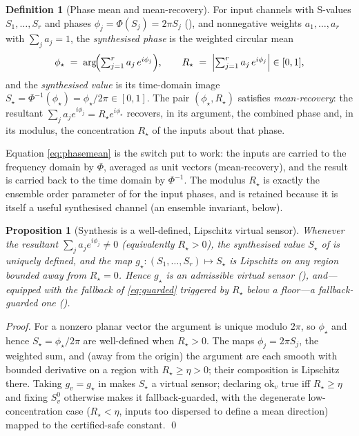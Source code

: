 \documentclass[11pt,a4paper,twocolumn]{article}
\theoremstyle{thmstyle}
\newtheorem{proposition}[theorem]{Proposition}
\theoremstyle{definition}
\newtheorem{definition}[theorem]{Definition}
\theoremstyle{remark}
\newcommand{\Rstar}{R_{\star}}
\begin{document}
\begin{definition}[Phase mean and mean-recovery]
\label{def:meanrec}
For input channels with S-values $S_1,\dots,S_r$ and phases
$\phi_j=\Phi(S_j)=2\pi S_j$ (), and nonnegative weights
$a_1,\dots,a_r$ with $\sum_j a_j=1$, the \emph{synthesised phase} is the
weighted circular mean
\begin{equation}
\label{eq:phasemean}
\phi_\star \;=\; \arg\!\Bigl(\textstyle\sum_{j=1}^{r} a_j\,e^{i\phi_j}\Bigr),
\qquad
\Rstar \;=\; \Bigl|\textstyle\sum_{j=1}^{r} a_j\,e^{i\phi_j}\Bigr|\in[0,1],
\end{equation}
and the \emph{synthesised value} is its time-domain image
$S_\star=\Phi^{-1}(\phi_\star)=\phi_\star/2\pi\in[0,1]$. The pair
$(\phi_\star,\Rstar)$ satisfies \emph{mean-recovery}: the resultant
$\sum_j a_j e^{i\phi_j}=\Rstar e^{i\phi_\star}$ recovers, in its
argument, the combined phase and, in its modulus, the concentration
$\Rstar$ of the inputs about that phase.
\end{definition}

Equation \eqref{eq:phasemean} is the switch put to work: the inputs are
carried to the frequency domain by $\Phi$, averaged as unit vectors
(mean-recovery), and the result is carried back to the time domain by
$\Phi^{-1}$. The modulus $\Rstar$ is exactly the ensemble order
parameter of  for the input phases, and is retained
because it is itself a useful synthesised channel (an ensemble invariant,
 below).

\begin{proposition}[Synthesis is a well-defined, Lipschitz virtual sensor]
\label{prop:synth-wd}
Whenever the resultant $\sum_j a_j e^{i\phi_j}\neq0$ \textup{(}equivalently
$\Rstar>0$\textup{)}, the synthesised value $S_\star$ of
 is uniquely defined, and the map
$g_\star\colon(S_1,\dots,S_r)\mapsto S_\star$ is Lipschitz on any region
bounded away from $\Rstar=0$. Hence $g_\star$ is an admissible virtual
sensor \textup{(}\textup{)}, and---equipped with the
fallback of \eqref{eq:guarded} triggered by $\Rstar$ below a floor---a
fallback-guarded one \textup{(}\textup{)}.
\end{proposition}

\begin{proof}
For a nonzero planar vector the argument is unique modulo $2\pi$, so
$\phi_\star$ and hence $S_\star=\phi_\star/2\pi$ are well-defined when
$\Rstar>0$. The maps $\phi_j=2\pi S_j$, the weighted sum, and (away
from the origin) the argument are each smooth with bounded derivative on a
region with $\Rstar\ge\eta>0$; their composition is Lipschitz there.
Taking $g_v=g_\star$ in  makes $S_\star$ a virtual
sensor; declaring $\mathrm{ok}_v$ true iff $\Rstar\ge\eta$ and fixing
$S_v^{0}$ otherwise makes it fallback-guarded, with the degenerate
low-concentration case ($\Rstar<\eta$, inputs too dispersed to define
a mean direction) mapped to the certified-safe constant. \qed
\end{proof}
\end{document}
